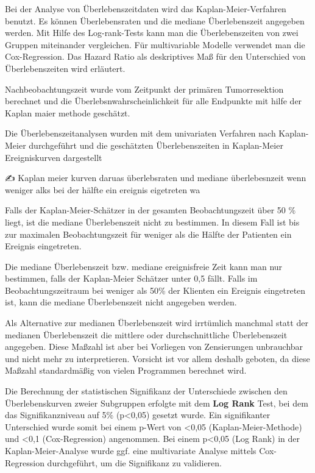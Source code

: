 Bei der Analyse von Überlebenszeitdaten wird das Kaplan-Meier-Verfahren benutzt. Es können Überlebensraten und die mediane Überlebenszeit angegeben werden. Mit Hilfe des Log-rank-Tests kann man die Überlebenszeiten von zwei Gruppen miteinander vergleichen. Für multivariable Modelle verwendet man die Cox-Regression. Das Hazard Ratio als deskriptives Maß für den Unterschied von Überlebenszeiten wird erläutert.

Nachbeobachtungszeit wurde vom Zeitpunkt der primären Tumorresektion berechnet und die Überlebsnwahrscheinlichkeit für alle Endpunkte mit hilfe der Kaplan maier methode geschätzt.

Die Überlebenszeitanalysen wurden mit dem univariaten Verfahren nach Kaplan- Meier durchgeführt und die geschätzten Überlebenszeiten in Kaplan-Meier Ereigniskurven dargestellt

✍ Kaplan meier kurven daruas überlebsraten und mediane überlebesnzeit wenn weniger alks bei der hälfte ein ereignis eigetreten wa

Falls der Kaplan-Meier-Schätzer in der gesamten Beobachtungszeit über 50 \% liegt, ist die mediane Überlebenszeit nicht zu bestimmen. In diesem Fall ist bis zur maximalen Beobachtungszeit für weniger als die Hälfte der Patienten ein Ereignis eingetreten.

Die mediane Überlebenszeit bzw. mediane ereignisfreie Zeit kann man nur bestimmen, falls der Kaplan-Meier Schätzer unter 0,5 fällt. Falls im Beobachtungszeitraum bei weniger als 50\% der Klienten ein Ereignis eingetreten ist, kann die mediane Überlebenszeit nicht angegeben werden.

Als Alternative zur medianen Überlebenszeit wird irrtümlich manchmal statt der medianen Überlebenszeit die mittlere oder durchschnittliche Überlebenszeit angegeben. Diese Maßzahl ist aber bei Vorliegen von Zensierungen unbrauchbar und nicht mehr zu interpretieren. Vorsicht ist vor allem deshalb geboten, da diese Maßzahl standardmäßig von vielen Programmen berechnet wird.

Die Berechnung der statistischen Signifikanz der Unterschiede zwischen den Überlebenskurven zweier Subgruppen erfolgte mit dem \textbf{Log Rank} Test, bei dem das Signifikanzniveau auf 5\% (p\textless0,05) gesetzt wurde. Ein signifikanter Unterschied wurde somit bei einem p-Wert von \textless0,05 (Kaplan-Meier-Methode) und \textless0,1 (Cox-Regression) angenommen. Bei einem p\textless0,05 (Log Rank) in der Kaplan-Meier-Analyse wurde ggf. eine multivariate Analyse mittels Cox-Regression durchgeführt, um die Signifikanz zu validieren.

